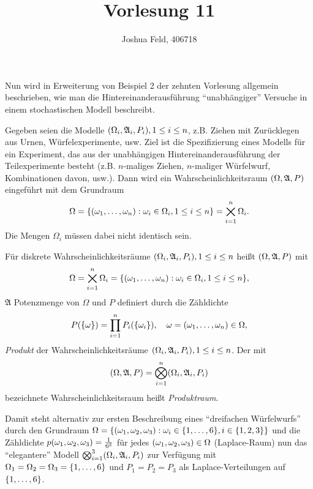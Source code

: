 \documentclass{lecture}
\institute{Institut für Statistik und Wirtschaftsmathematik}
\title{Vorlesung 11}
\author{Joshua Feld, 406718}
\begin{document}
    \maketitle


    Nun wird in Erweiterung von Beispiel 2 der zehnten Vorlesung allgemein beschrieben, wie man die Hintereinanderausführung ``unabhängiger'' Versuche in einem stochastischen Modell beschreibt.

    Gegeben seien die Modelle \(\parentheses*{\Omega_i, \mathfrak{A}_i, P_i}, 1 \le i \le n\), z.B. Ziehen mit Zurücklegen aus Urnen, Würfelexperimente, usw.
    Ziel ist die Spezifizierung eines Modells für ein Experiment, das aus der unabhängigen Hintereinanderausführung der Teilexperimente besteht (z.B. \(n\)-maliges Ziehen, \(n\)-maliger Würfelwurf, Kombinationen davon, usw.).
    Dann wird ein Wahrscheinlichkeitsraum \(\parentheses*{\Omega, \mathfrak{A}, P}\) eingeführt mit dem Grundraum
    \[
        \Omega = \braces*{\parentheses*{\omega_1, \ldots, \omega_n} : \omega_i \in \Omega_i, 1 \le i \le n} = \bigtimes_{i = 1}^n \Omega_i.
    \]
    Die Mengen \(\Omega_i\) müssen dabei nicht identisch sein.

    \begin{definition}
        Für diskrete Wahrscheinlichkeitsräume \(\parentheses*{\Omega_i, \mathfrak{A}_i, P_i}, 1 \le i \le n\) heißt \(\parentheses*{\Omega, \mathfrak{A}, P}\) mit
        \[
            \Omega = \bigtimes_{i = 1}^n \Omega_i = \braces*{\parentheses*{\omega_1, \ldots, \omega_n} : \omega_i \in \Omega_i, 1 \le i \le n},
        \]
        \(\mathfrak{A}\) Potenzmenge von \(\Omega\) und \(P\) definiert durch die Zähldichte
        \[
            P\parentheses*{\braces*{\omega}} = \prod_{i = 1}^n P_i\parentheses*{\braces*{\omega_i}}, \quad \omega = \parentheses*{\omega_1, \ldots, \omega_n} \in \Omega,
        \]
        \emph{Produkt} der Wahrscheinlichkeitsräume \(\parentheses*{\Omega_i, \mathfrak{A}_i, P_i}, 1 \le i \le n\).
        Der mit
        \[
            \parentheses*{\Omega, \mathfrak{A}, P} = \bigotimes_{i = 1}^n \parentheses*{\Omega_i, \mathfrak{A}_i, P_i} 
        \]
        bezeichnete Wahrscheinlichkeitsraum heißt \emph{Produktraum}.
    \end{definition}

    Damit steht alternativ zur ersten Beschreibung eines ``dreifachen Würfelwurfs'' durch den Grundraum \(\Omega = \braces*{\parentheses*{\omega_1, \omega_2, \omega_3} : \omega_i \in \braces*{1, \ldots, 6}, i \in \braces*{1, 2, 3}}\) und die Zähldichte \(p\parentheses*{\omega_1, \omega_2, \omega_3} = \frac{1}{6^3}\) für jedes \(\parentheses*{\omega_1, \omega_2, \omega_3} \in \Omega\) (Laplace-Raum) nun das ``elegantere'' Modell \(\bigotimes_{i = 1}^3 \parentheses*{\Omega_i, \mathfrak{A}_i, P_i}\) zur Verfügung mit \(\Omega_1 = \Omega_2 = \Omega_3 = \braces*{1, \ldots, 6}\) und \(P_1 = P_2 = P_3\) als Laplace-Verteilungen auf \(\braces*{1, \ldots, 6}\).
\end{document}
